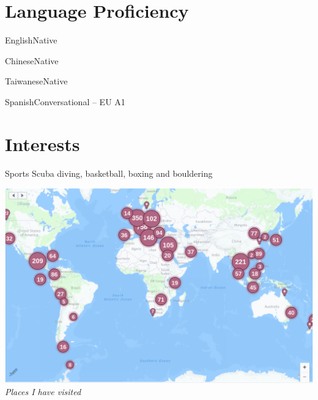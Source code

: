 \documentclass{tccv}
\begin{document}
      


\begin{factlist}

\end{factlist}

\section{Language Proficiency}

\begin{factlist}
\item{English}{Native}
\item{Chinese}{Native}
\item{Taiwanese}{Native}
\item{Spanish}{Conversational -- EU A1}
\end{factlist}


\section{Interests}

\begin{factlist}
\item{Sports} {Scuba diving, basketball, boxing and bouldering}
\end{factlist}

\FloatBarrier
  \centering
  \includegraphics[scale = 0.2]{places_I_have_been_2.png}
  \textit{Places I have visited}
\FloatBarrier
\end{document}
